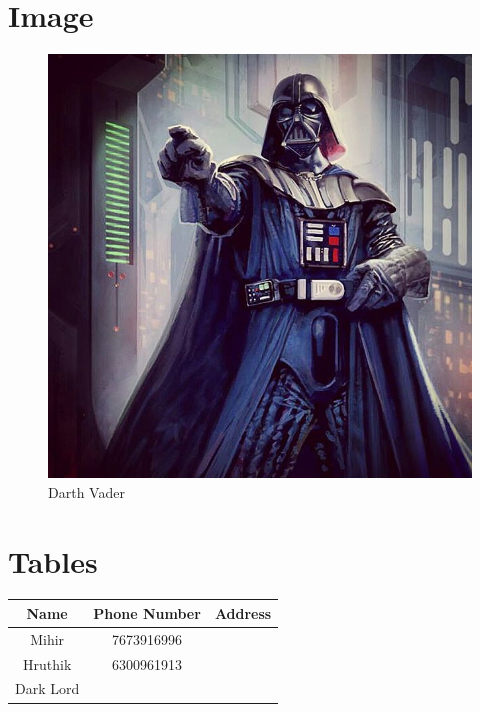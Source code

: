 \documentclass[a4paper,15pt]{article}
\begin{document}
	\section{Image}
	\begin{figure}[h!bt]
		\centering
		\includegraphics[width=\textwidth]{DarthVader.jpg}
		\caption{Darth Vader}
		\label{Darth Vader}
	\end{figure}
	\newpage
	\section{Tables}
	\begin{tabular}{|c|c|cc|}
		\hline
		\textbf{Name} & \textbf{Phone Number} & \multicolumn{2}{c}{\textbf{Address}} \\
		\hline
		Mihir & 7673916996 & & \\
		\cline{1-2}
		Hruthik & 6300961913 & & \\
		\cline{1-2}
		\multirow{2}{*}{Dark Lord} & & & \\
		\cline{2-2}
		& & & \\
		\hline
	\end{tabular}
\end{document}
